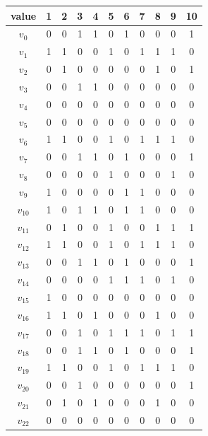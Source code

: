 \documentclass{article}
\begin{document}
    \begin{table}[htb!]
    \small
    \begin{minipage}{0.475\linewidth}
    \begin{tabular}{c | c c c c c c c c c c}
        \hline
        value & 1 & 2 & 3 & 4 & 5 & 6 & 7 & 8 & 9 & 10 \\
        \hline
        $v_0$ & 0 & 0 & 1 & 1 & 0 & 1 & 0 & 0 & 0 & 1 \\
        $v_1$ & 1 & 1 & 0 & 0 & 1 & 0 & 1 & 1 & 1 & 0 \\
        $v_2$ & 0 & 1 & 0 & 0 & 0 & 0 & 0 & 1 & 0 & 1 \\
        $v_3$ & 0 & 0 & 1 & 1 & 0 & 0 & 0 & 0 & 0 & 0 \\
        $v_4$ & 0 & 0 & 0 & 0 & 0 & 0 & 0 & 0 & 0 & 0 \\
        $v_5$ & 0 & 0 & 0 & 0 & 0 & 0 & 0 & 0 & 0 & 0 \\
        $v_6$ & 1 & 1 & 0 & 0 & 1 & 0 & 1 & 1 & 1 & 0 \\
        $v_7$ & 0 & 0 & 1 & 1 & 0 & 1 & 0 & 0 & 0 & 1 \\
        $v_8$ & 0 & 0 & 0 & 0 & 1 & 0 & 0 & 0 & 1 & 0 \\
        $v_9$ & 1 & 0 & 0 & 0 & 0 & 1 & 1 & 0 & 0 & 0 \\
        $v_{10}$ & 1 & 0 & 1 & 1 & 0 & 1 & 1 & 0 & 0 & 0 \\
        $v_{11}$ & 0 & 1 & 0 & 0 & 1 & 0 & 0 & 1 & 1 & 1 \\
        $v_{12}$ & 1 & 1 & 0 & 0 & 1 & 0 & 1 & 1 & 1 & 0 \\
        $v_{13}$ & 0 & 0 & 1 & 1 & 0 & 1 & 0 & 0 & 0 & 1 \\
        $v_{14}$ & 0 & 0 & 0 & 0 & 1 & 1 & 1 & 0 & 1 & 0 \\
        $v_{15}$ & 1 & 0 & 0 & 0 & 0 & 0 & 0 & 0 & 0 & 0 \\
        $v_{16}$ & 1 & 1 & 0 & 1 & 0 & 0 & 0 & 1 & 0 & 0 \\
        $v_{17}$ & 0 & 0 & 1 & 0 & 1 & 1 & 1 & 0 & 1 & 1 \\
        $v_{18}$ & 0 & 0 & 1 & 1 & 0 & 1 & 0 & 0 & 0 & 1 \\
        $v_{19}$ & 1 & 1 & 0 & 0 & 1 & 0 & 1 & 1 & 1 & 0 \\
        $v_{20}$ & 0 & 0 & 1 & 0 & 0 & 0 & 0 & 0 & 0 & 1 \\
        $v_{21}$ & 0 & 1 & 0 & 1 & 0 & 0 & 0 & 1 & 0 & 0 \\
        $v_{22}$ & 0 & 0 & 0 & 0 & 0 & 0 & 0 & 0 & 0 & 0 \\

\end{tabular}
\end{minipage}
\end{table}
\end{document}
